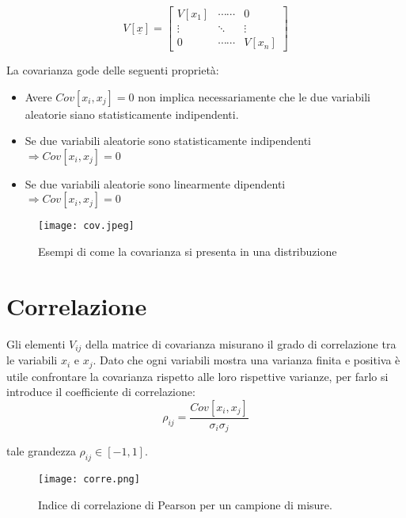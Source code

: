 \documentclass[11pt,a4paper]{book}
\begin{document}
\begin{equation}
	V[\underline{x}] = \begin{bmatrix}
		V[x_1] & \cdots \cdots	& 0 \\
		\vdots &\ddots & \vdots \\
		0 & \cdots \cdots & V[x_n]
	\end{bmatrix}
\end{equation}
\newline

La covarianza gode delle seguenti propriet\`{a}:
\begin{itemize}
	\item Avere $Cov[x_i,x_j] = 0 $ non implica necessariamente che le due variabili aleatorie siano statisticamente indipendenti.
	\item Se due variabili aleatorie sono statisticamente indipendenti \\ $\Rightarrow Cov[x_i,x_j] = 0 $
	\item Se due variabili aleatorie sono linearmente dipendenti \\$\Rightarrow Cov[x_i,x_j] = 0 $
\end{itemize}
 
 
\begin{figure}[ht]

\texttt{[image: cov.jpeg]}	
\centering
\caption{Esempi di come la covarianza si presenta in una distribuzione}
\end{figure} 

\section{Correlazione}
Gli elementi $V_{ij}$ della matrice di covarianza misurano il grado di correlazione tra le variabili $x_i$ e $x_j$. Dato che ogni variabili mostra una varianza finita e positiva \`{e} utile confrontare la covarianza  rispetto alle loro rispettive varianze, per farlo si introduce il coefficiente di correlazione:
\begin{equation}
	\rho_{ij} = \dfrac{Cov[x_i,x_j]}{\sigma_i \sigma_j}
\end{equation}

tale grandezza $\rho_{ij} \in [-1,1]$.

\begin{figure}[ht]
\vspace{0.2in}
\texttt{[image: corre.png]}	
\centering
\vspace{0.2in}
\caption{Indice di correlazione di Pearson per un campione di misure.}
\end{figure} 
\end{document}
